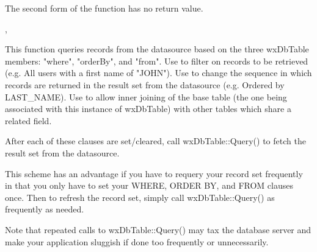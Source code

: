 The second form of the function has no return value.


,

\label{wxdbtablequery}





This function queries records from the datasource based on the three
wxDbTable members: "where", "orderBy", and "from".  Use
 to filter on
records to be retrieved (e.g. All users with a first name of "JOHN").
Use  to
change the sequence in which records are returned in the result set from
the datasource (e.g. Ordered by LAST\_NAME).  Use
 to allow inner
joining of the base table (the one being associated with this instance of
wxDbTable) with other tables which share a related field.

After each of these clauses are set/cleared, call wxDbTable::Query() to
fetch the result set from the datasource.

This scheme has an advantage if you have to requery your record set
frequently in that you only have to set your WHERE, ORDER BY, and FROM
clauses once.  Then to refresh the record set, simply call wxDbTable::Query()
as frequently as needed.

Note that repeated calls to wxDbTable::Query() may tax the database
server and make your application sluggish if done too frequently or
unnecessarily.

